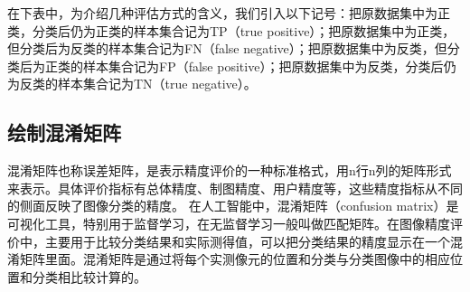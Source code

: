 \documentclass[a4paper,12pt]{article}
\begin{document}
在下表中，为介绍几种评估方式的含义，我们引入以下记号：把原数据集中为正类，分类后仍为正类的样本集合记为TP（true positive）；把原数据集中为正类，但分类后为反类的样本集合记为FN（false negative）；把原数据集中为反类，但分类后为正类的样本集合记为FP（false positive）；把原数据集中为反类，分类后仍为反类的样本集合记为TN（true negative）。
\renewcommand\arraystretch{1.85}
\begin{table}[htbp]\huge
	\caption{四种评估标准的定义}
\end{table}
\subsection{绘制混淆矩阵}

混淆矩阵也称误差矩阵，是表示精度评价的一种标准格式，用n行n列的矩阵形式来表示。具体评价指标有总体精度、制图精度、用户精度等，这些精度指标从不同的侧面反映了图像分类的精度。 在人工智能中，混淆矩阵（confusion matrix）是可视化工具，特别用于监督学习，在无监督学习一般叫做匹配矩阵。在图像精度评价中，主要用于比较分类结果和实际测得值，可以把分类结果的精度显示在一个混淆矩阵里面。混淆矩阵是通过将每个实测像元的位置和分类与分类图像中的相应位置和分类相比较计算的。
\end{document}
